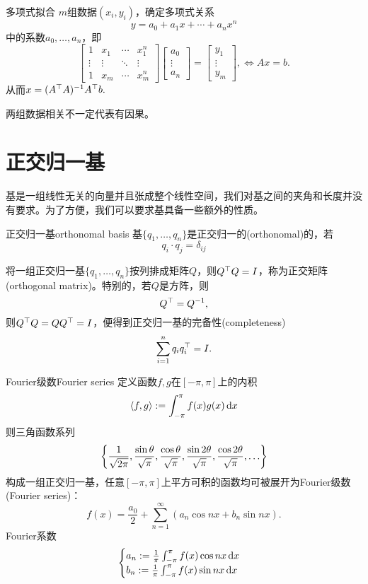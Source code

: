 \begin{method}{多项式拟合}{}
	$m$组数据$(x_i,y_i)$，确定多项式关系
	\[
		y=a_0+a_1x+\cdots+a_nx^n
	\]
	中的系数$a_0,\ldots,a_n$，即 
	\[
		\begin{bmatrix}
			1&x_1&\cdots&x_1^n\\\vdots&\vdots&\ddots&\vdots\\1&x_m&\cdots&x_m^n
		\end{bmatrix}
		\begin{bmatrix}
			a_0\\\vdots\\a_n
		\end{bmatrix}=
		\begin{bmatrix}
			y_1\\\vdots\\y_m
		\end{bmatrix},\iff Ax=b.
	\]
	从而$x=(A^\top A)^{-1} A^\top b.$
\end{method}

\begin{remark}
	两组数据相关不一定代表有因果。
\end{remark}

\section{正交归一基}

基是一组线性无关的向量并且张成整个线性空间，我们对基之间的夹角和长度并没有要求。为了方便，我们可以要求基具备一些额外的性质。
\begin{definition}{正交归一基}{orthonomal basis}
	基$\{q_1,\ldots,q_n\}$是正交归一的(orthonomal)的，若 
	\[
		q_i\cdot q_j=\delta_{ij}
	\]
\end{definition}
将一组正交归一基$\{q_1,\ldots,q_n\}$按列排成矩阵$Q$，则$Q^\top Q=I$，称为正交矩阵(orthogonal matrix)。特别的，若$Q$是方阵，则
\[
	Q^\top=Q^{-1},
\]
则$Q^\top Q=QQ^\top=I$，便得到正交归一基的完备性(completeness)
\[
	\sum_{i=1}^nq_iq_i^\top=I.
\]
\begin{example}{Fourier级数}{Fourier series}
	定义函数$f,g$在$[-\pi,\pi]$上的内积
	\[
		\left\langle f,g\right\rangle:=\int_{-\pi}^\pi f(x)g(x)\mathop{}\!\mathrm{d} x
	\]
	则三角函数系列
	\[
		\left\{\frac1{\sqrt{2\pi}},\frac{\sin\theta}{\sqrt\pi},\frac{\cos\theta}{\sqrt\pi},\frac{\sin2\theta}{\sqrt\pi},\frac{\cos2\theta}{\sqrt\pi},\ldots\right\}
	\]
	构成一组正交归一基，任意$[-\pi,\pi]$上平方可积的函数均可被展开为Fourier级数(Fourier series)：
	\[
		f(x)=\frac{a_0}2+\sum_{n=1}^\infty(a_n\cos nx+b_n\sin nx).
	\]
	Fourier系数
	\[
		\begin{cases}
			a_n:=\frac1\pi\int_{-\pi}^\pi f(x)\cos nx\mathop{}\!\mathrm{d} x\\
			b_n:=\frac1\pi\int_{-\pi}^\pi f(x)\sin nx\mathop{}\!\mathrm{d} x
		\end{cases}
	\]
\end{example}

